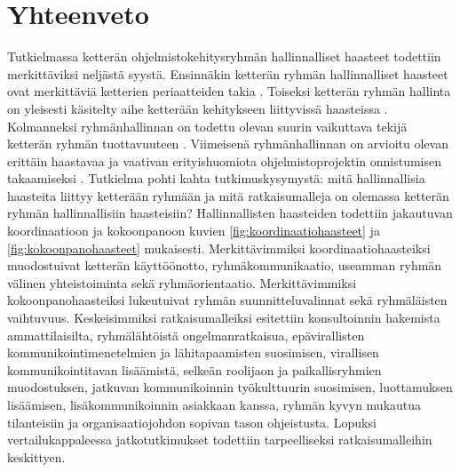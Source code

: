 \chapter{Yhteenveto\label{conclusions}}

Tutkielmassa ketterän ohjelmistokehitysryhmän hallinnalliset haasteet todettiin merkittäviksi neljästä syystä. Ensinnäkin ketterän ryhmän hallinnalliset haasteet ovat merkittäviä ketterien periaatteiden takia \cite{beck2001agile}. Toiseksi ketterän ryhmän hallinta on yleisesti käsitelty aihe ketterään kehitykseen liittyvissä haasteissa \cite{7872736}. Kolmanneksi ryhmänhallinnan on todettu olevan suurin vaikuttava tekijä ketterän ryhmän tuottavuuteen \cite{DEOMELO2013412}. Viimeisenä ryhmänhallinnan on arvioitu olevan erittäin haastavaa ja vaativan erityishuomiota ohjelmistoprojektin onnistumisen takaamiseksi \cite{7872736}. Tutkielma pohti kahta tutkimuskysymystä: mitä hallinnallisia haasteita liittyy ketterään ryhmään ja mitä ratkaisumalleja on olemassa ketterän ryhmän hallinnallisiin haasteisiin? Hallinnallisten haasteiden todettiin jakautuvan koordinaatioon ja kokoonpanoon kuvien \ref{fig:koordinaatiohaasteet} ja \ref{fig:kokoonpanohaasteet} mukaisesti. Merkittävimmiksi koordinaatiohaasteiksi muodostuivat ketterän käyttöönotto, ryhmäkommunikaatio, useamman ryhmän välinen yhteistoiminta sekä ryhmäorientaatio. Merkittävimmiksi kokoonpanohaasteiksi lukeutuivat ryhmän suunnitteluvalinnat sekä ryhmäläisten vaihtuvuus. Keskeisimmiksi ratkaisumalleiksi esitettiin konsultoinnin hakemista ammattilaisilta, ryhmälähtöistä ongelmanratkaisua, epävirallisten kommunikointimenetelmien ja lähitapaamisten suosimisen, virallisen kommunikointitavan lisäämistä, selkeän roolijaon ja paikallisryhmien muodostuksen, jatkuvan kommunikoinnin työkulttuurin suosimisen, luottamuksen lisäämisen, lisäkommunikoinnin asiakkaan kanssa, ryhmän kyvyn mukautua tilanteisiin ja organisaatiojohdon sopivan tason ohjeistusta. Lopuksi vertailukappaleessa jatkotutkimukset todettiin tarpeelliseksi ratkaisumalleihin keskittyen.
